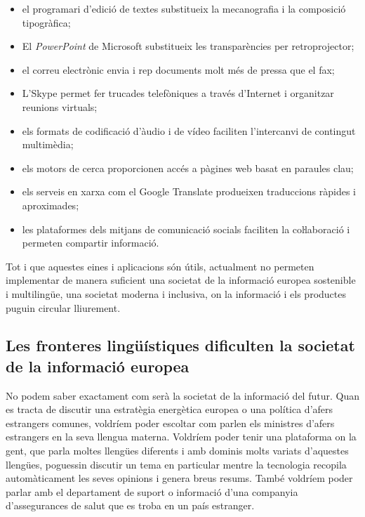 \begin{multicols}{2}
\begin{itemize}
\item el programari d’edició de textes substitueix la mecanografia i la composició tipogràfica;
\item El \textit{PowerPoint} de Microsoft substitueix les transparències per retroprojector;
\item el correu electrònic envia i rep documents molt més de pressa que el fax;
\item L’Skype permet fer trucades telefòniques a través d’Internet i organitzar reunions virtuals;
\item els formats de codificació d’àudio i de vídeo faciliten l’intercanvi de contingut multimèdia;
\item els motors de cerca proporcionen accés a pàgines web basat en paraules clau;
\item els serveis en xarxa com el Google Translate produeixen traduccions ràpides i aproximades;
\item les plataformes dels mitjans de comunicació socials faciliten la coŀlaboració i permeten compartir informació.
\end{itemize}

Tot i que aquestes eines i aplicacions són útils, actualment no permeten implementar de manera suficient una societat de la informació europea sostenible i multilingüe, una societat moderna i inclusiva, on la informació i els productes puguin circular lliurement.

\subsection{Les fronteres lingüístiques dificulten la societat de la informació europea}
  
No podem saber exactament com serà la societat de la informació del futur. Quan es tracta de discutir una estratègia energètica europea o una política d’afers estrangers comunes, voldríem poder escoltar com parlen els ministres d’afers estrangers en la seva llengua materna. Voldríem poder tenir una plataforma on la gent, que parla moltes llengües diferents i amb dominis molts variats d’aquestes llengües, poguessin discutir un tema en particular mentre la tecnologia recopila automàticament les seves opinions i genera breus resums. També voldríem poder parlar amb el departament de suport o informació d’una companyia d’assegurances de salut que es troba en un país estranger.



\end{multicols}
